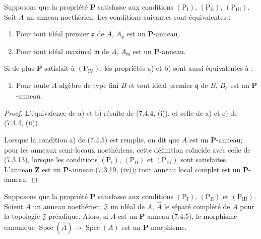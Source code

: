 \begin{corollary}[7.4.5]
\label{IV.2.s7.4.5-fr}
Supposons que la propriété $\boldsymbol P$ satisfasse aux conditions
$(\mathrm P_{\mathrm I})$, $(\mathrm P_{\mathrm{II}})$,
$(\mathrm P_{\mathrm{III}})$. Soit $A$ un anneau noethérien. Les conditions
suivantes sont équivalentes :
\begin{enumerate}
\item[\emph{a)}] Pour tout idéal premier $\mathfrak p$ de $A$,
$A_{\mathfrak p}$ est un $\boldsymbol P$-anneau.
\item[\emph{b)}] Pour tout idéal maximal $\mathfrak m$ de $A$,
$A_{\mathfrak m}$ est un $\boldsymbol P$-anneau.
\end{enumerate}
Si de plus $\boldsymbol P$ satisfait à $(\mathrm P_{\mathrm{IV}})$, les
propriétés a) et b) sont aussi équivalentes à :
\begin{enumerate}
\item[\emph{c)}] Pour toute $A$-algèbre de type fini $B$ et tout idéal
premier $\mathfrak q$ de $B$, $B_{\mathfrak q}$ est un
$\boldsymbol P$-anneau.
\end{enumerate}
\end{corollary}

\begin{proof}
L'équivalence de a) et b) résulte de (7.4.4, (i)), et celle de a) et c) de
(7.4.4, (ii)).

Lorsque la condition a) de (7.4.5) est remplie, on dit que $A$ est un
$\boldsymbol P$-anneau; pour les anneaux semi-locaux noethériens, cette
définition coïncide avec celle de (7.3.13), lorsque les conditions
$(\mathrm P_{\mathrm I})$, $(\mathrm P_{\mathrm{II}})$ et
$(\mathrm P_{\mathrm{III}})$ sont satisfaites. L'anneau $\mathbf Z$ est un
$\boldsymbol P$-anneau (7.3.19, (iv)); tout anneau local complet est un
$\boldsymbol P$-anneau.
\end{proof}

\begin{proposition}[7.4.6]
\label{IV.2.s7.4.6-fr}
Supposons que la propriété $\boldsymbol P$ satisfasse aux conditions
$(\mathrm P_{\mathrm I})$, $(\mathrm P_{\mathrm{II}})$ et
$(\mathrm P_{\mathrm{III}})$. Soient $A$ un anneau noethérien,
$\mathfrak J$ un idéal de $A$, $\widehat A$ le séparé complété de $A$ pour
la topologie $\mathfrak J$-préadique. Alors, si $A$ est un
$\boldsymbol P$-anneau (7.4.5), le morphisme canonique
$\operatorname{Spec}(\widehat A)\to\operatorname{Spec}(A)$ est un
$\boldsymbol P$-morphisme.
\end{proposition}


